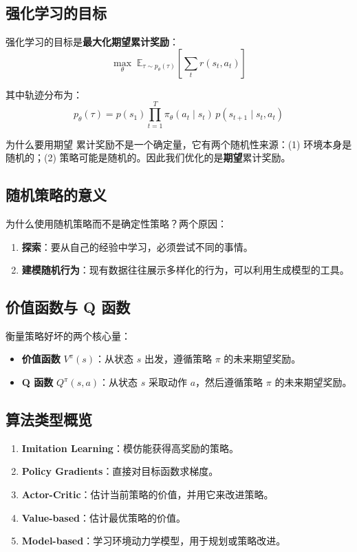\subsection{强化学习的目标}

强化学习的目标是\textbf{最大化期望累计奖励}：
$$\max_\theta \; \mathbb{E}_{\tau \sim p_\theta(\tau)} \left[ \sum_{t} r(s_t, a_t) \right]$$

其中轨迹分布为：
$$p_\theta(\tau) = p(s_1) \prod_{t=1}^{T} \pi_\theta(a_t \mid s_t) \, p(s_{t+1} \mid s_t, a_t)$$

\begin{warningbox}{为什么要用期望}
累计奖励不是一个确定量，它有两个随机性来源：(1) 环境本身是随机的；(2) 策略可能是随机的。因此我们优化的是\textbf{期望}累计奖励。
\end{warningbox}

\subsection{随机策略的意义}

为什么使用随机策略而不是确定性策略？两个原因：
\begin{enumerate}
    \item \textbf{探索}：要从自己的经验中学习，必须尝试不同的事情。
    \item \textbf{建模随机行为}：现有数据往往展示多样化的行为，可以利用生成模型的工具。
\end{enumerate}

\subsection{价值函数与 Q 函数}

衡量策略好坏的两个核心量：

\begin{itemize}
    \item \textbf{价值函数} $V^\pi(s)$：从状态 $s$ 出发，遵循策略 $\pi$ 的未来期望奖励。
    \item \textbf{Q 函数} $Q^\pi(s, a)$：从状态 $s$ 采取动作 $a$，然后遵循策略 $\pi$ 的未来期望奖励。
\end{itemize}

\subsection{算法类型概览}

\begin{enumerate}
    \item \textbf{Imitation Learning}：模仿能获得高奖励的策略。
    \item \textbf{Policy Gradients}：直接对目标函数求梯度。
    \item \textbf{Actor-Critic}：估计当前策略的价值，并用它来改进策略。
    \item \textbf{Value-based}：估计最优策略的价值。
    \item \textbf{Model-based}：学习环境动力学模型，用于规划或策略改进。
\end{enumerate}

